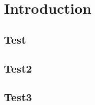 \chapter{Introduction}
\lipsum[2-5]

\section{Test}
\lipsum[2-5]

\section{Test2}
\lipsum[2-5]

\section{Test3}
\lipsum[2-5]